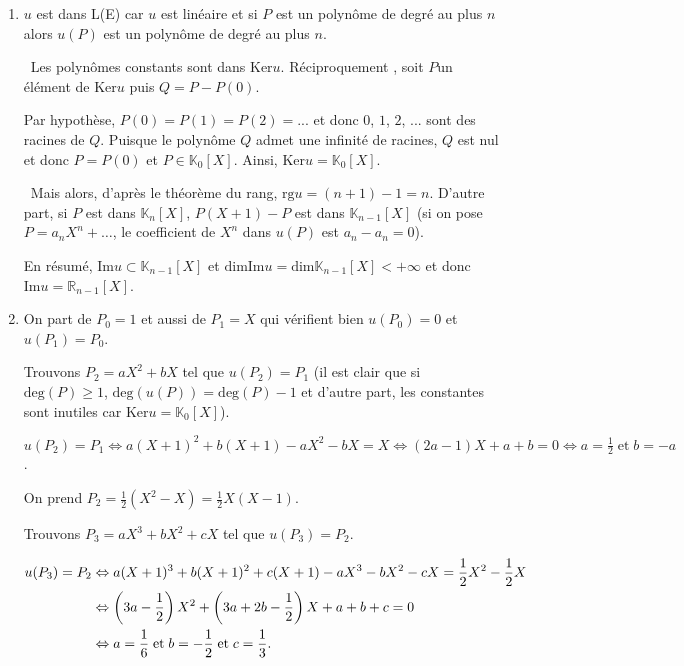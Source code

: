 \documentclass[11pt,a4paper]{article}
\newcommand{\Rr}{\mathbb{R}} \newcommand{\R}{\mathbb{R}}
\newcommand{\Kk}{\mathbb{K}} \newcommand{\K}{\mathbb{K}}
\begin{document}
\begin{enumerate}
 \item  $u$ est dans L(E) car $u$ est linéaire et si $P$ est un polynôme de degré au plus $n$ alors $u(P)$ est un polynôme de degré au plus $n$.

\textbullet~Les polynômes constants sont dans $\text{Ker}u$. Réciproquement , soit $P$un élément de $\text{Ker}u$ puis $Q = P - P(0)$.

Par hypothèse, $P(0) = P(1) = P(2) = ...$ et donc $0$, $1$, $2$, ... sont des racines de $Q$. Puisque le polynôme $Q$ admet une infinité de racines, $Q$ est nul et donc $P = P(0)$ et $P\in\Kk_0[X]$. Ainsi, $\text{Ker}u =\Kk_0[X]$. 

\textbullet~Mais alors, d'après le théorème du rang, $\text{rg}u =(n+1)-1 = n$.
D'autre part, si $P$ est dans $\Kk_n[X]$, $P(X+1)-P$ est dans $\Kk_{n-1}[X]$ (si on pose $P=a_nX^n+\ldots$, le coefficient de $X^n$ dans $u(P)$ est $a_n-a_n=0$).

En résumé, $\text{Im}u\subset\Kk_{n-1}[X]$ et $\text{dim}\text{Im}u=\text{dim}\Kk_{n-1}[X]<+\infty$ et donc $\text{Im}u=\Rr_{n-1}[X]$.

\begin{center}
\shadowbox{
$\text{Ker}u=\Kk_0[X]$ et $\text{Im}u=\Kk_{n-1}[X]$.
}
\end{center}

\item  On part de $P_0 = 1$ et aussi de $P_1 = X$ qui vérifient bien $u(P_0) = 0$ et $u(P_1) = P_0$.

Trouvons $P_2=aX^2 + bX$ tel que $u(P_2) = P_1$ (il est clair que si $\text{deg}(P)\geqslant1$, $\text{deg}(u(P))=\text{deg}(P)-1$ et d'autre part, les constantes sont inutiles car $\text{Ker}u=\Kk_0[X]$).

\begin{center}
$u(P_2) =P_1\Leftrightarrow a(X+1)^2 +b(X+1) - aX^2 - bX =X\Leftrightarrow (2a-1)X +a+b =0\Leftrightarrow a =\frac{1}{2}\;\text{et}\;b = -a$.
\end{center}

On prend $P_2=\frac{1}{2}(X^2-X)=\frac{1}{2}X(X-1)$.

Trouvons $P_3=aX^3 + bX^2+cX$ tel que $u(P_3) = P_2$.

\begin{align*}\ensuremath
u(P_3) =P_2&\Leftrightarrow a(X+1)^3 +b(X+1)^2+c(X+1) - aX^3 - bX^2-cX =\frac{1}{2}X^2-\frac{1}{2}X\\
 &\Leftrightarrow \left(3a-\frac{1}{2}\right)X^2+\left(3a+2b-\frac{1}{2}\right)X+a+b+c=0\\
 &\Leftrightarrow a =\frac{1}{6}\;\text{et}\;b =-\frac{1}{2}\;\text{et}\;c=\frac{1}{3}.
\end{align*}


\end{enumerate}
\end{document}
